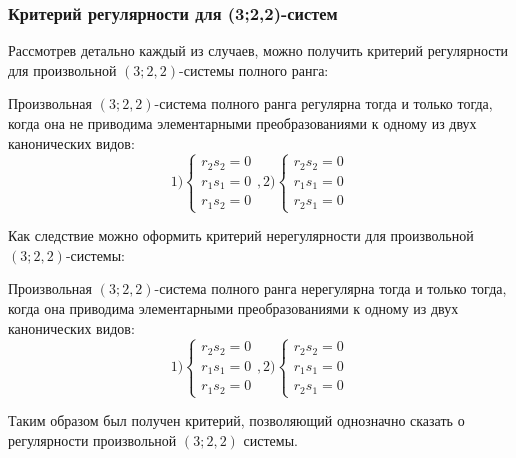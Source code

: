 \subsubsection{Критерий регулярности для (3;2,2)-систем}
Рассмотрев детально каждый из случаев, можно получить критерий регулярности для произвольной 
$(3;2,2)$-системы полного ранга: 

\begin{theorem}
	Произвольная $(3;2,2)$-система полного ранга регулярна тогда и только тогда, когда она 
	не приводима элементарными преобразованиями к одному из двух канонических видов: 
	\begin{equation}
		1)
		\begin{cases} 	
			r_2 s_2 = 0 \\ 
			r_1 s_1 = 0 \\
			r_1 s_2 = 0
		\end{cases},
		2)
		\begin{cases} 
			r_2 s_2 = 0 \\ 
			r_1 s_1 = 0 \\
			r_2 s_1 = 0
		\end{cases}
	\end{equation}
\end{theorem}
Как следствие можно оформить критерий нерегулярности для произвольной $(3;2,2)$-системы: 
\begin{consequence}
	Произвольная $(3;2,2)$-система полного ранга нерегулярна тогда и только тогда, когда она 
	приводима элементарными преобразованиями к одному из двух канонических видов: 
	\begin{equation}
		1)
		\begin{cases} 	
			r_2 s_2 = 0 \\ 
			r_1 s_1 = 0 \\
			r_1 s_2 = 0
		\end{cases},
		2)
		\begin{cases} 
			r_2 s_2 = 0 \\ 
			r_1 s_1 = 0 \\
			r_2 s_1 = 0
		\end{cases}
	\end{equation}
\end{consequence}
Таким образом был получен критерий, позволяющий однозначно сказать о регулярности 
произвольной $(3;2,2)$ системы.

